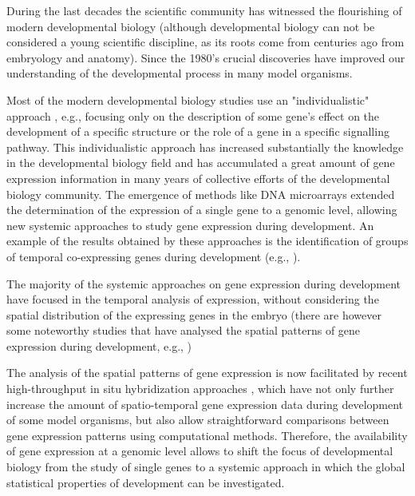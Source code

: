 
During the last decades the scientific community has witnessed the flourishing of modern developmental biology (although developmental biology can not be considered a young scientific discipline, as its roots come from centuries ago from embryology and anatomy). Since the 1980's crucial discoveries \citep{Gilbert1998} have improved our understanding of the developmental process in many model organisms.

Most of the modern developmental biology studies use an "individualistic" approach \citep{Davidson2009}, e.g., focusing only on the description of some gene's effect on the development of a specific structure or the role of a gene in a specific signalling pathway.
%
This individualistic approach has increased substantially the knowledge in the developmental biology field and has accumulated a great amount of gene expression information in many years of collective efforts of the developmental biology community.
The emergence of methods like DNA microarrays extended the determination of the expression of a single gene to a genomic level, allowing new systemic approaches to study gene expression during development. An example of the results obtained by these approaches is the identification of groups of temporal co-expressing genes during development (e.g., \citealp{Arbeitman2002,Hooper2007}).

The majority of the systemic approaches on gene expression during development have focused in the temporal analysis of expression, without considering the spatial distribution of the expressing genes in the embryo (there are however some noteworthy studies that have analysed the spatial patterns of gene expression during development, e.g., \citealp{Gurunathan2004,Tomancak2007,Frise2010,Crombach2012,Konikoff2012} )

The analysis of the spatial patterns of gene expression is now facilitated by recent high-throughput in situ hybridization approaches \citep{Tomancak2002,Pollet2003,Imai2004,Christiansen2006,Lecuyer2007,Tassy2010}, which have not only further increase the amount of spatio-temporal gene expression data during development of some model organisms, but also allow straightforward comparisons between gene expression patterns using computational methods.
Therefore, the availability of gene expression at a genomic level allows to shift the focus of developmental biology from the study of single genes to a systemic approach in which the global statistical properties of development can be investigated.

